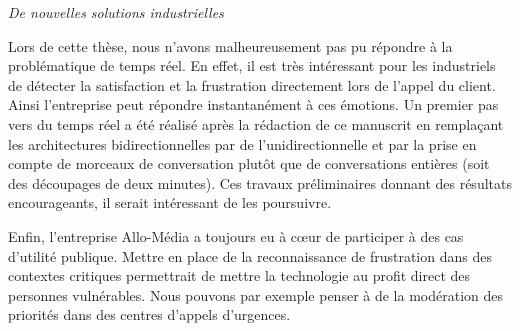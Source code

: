 \vspace{1cm}

\textit{De nouvelles solutions industrielles}

Lors de cette thèse, nous n'avons malheureusement pas pu répondre à la problématique de temps réel. En effet, il est très intéressant pour les industriels de détecter la satisfaction et la frustration directement lors de l'appel du client. Ainsi l'entreprise peut répondre instantanément à ces émotions. Un premier pas vers du temps réel a été réalisé après la rédaction de ce manuscrit en remplaçant les architectures bidirectionnelles par de l'unidirectionnelle et par la prise en compte de morceaux de conversation plutôt que de conversations entières (soit des découpages de deux minutes). Ces travaux préliminaires donnant des résultats encourageants, il serait intéressant de les poursuivre.

Enfin, l'entreprise Allo-Média a toujours eu à cœur de participer à des cas d'utilité publique. Mettre en place de la reconnaissance de frustration dans des contextes critiques permettrait de mettre la technologie au profit direct des personnes vulnérables. Nous pouvons par exemple penser à de la modération des priorités dans des centres d'appels d'urgences.
